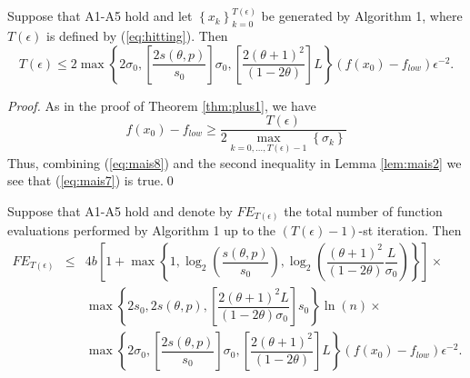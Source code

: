 \begin{theorem}
\label{thm:mais1}
Suppose that A1-A5 hold and let $\left\{x_{k}\right\}_{k=0}^{T(\epsilon)}$ be generated by Algorithm 1, where $T(\epsilon)$ is defined by (\ref{eq:hitting}). Then
\begin{equation}
T(\epsilon)\leq 2\max\left\{2\sigma_{0},\left[\dfrac{2 s(\theta,p)}{ s_{0}}\right]\sigma_{0},\left[\dfrac{2(\theta+1)^{2}}{(1-2\theta)}\right]L\right\}(f(x_{0})-f_{low})\epsilon^{-2}.
\label{eq:mais7}
\end{equation}
\end{theorem}

\begin{proof}
As in the proof of Theorem \ref{thm:plus1}, we have
\begin{equation}
f(x_{0})-f_{low}\geq\dfrac{T(\epsilon)}{2\max_{k=0,\ldots,T(\epsilon)-1}\left\{\sigma_{k}\right\}}
\label{eq:mais8}
\end{equation}
Thus, combining (\ref{eq:mais8}) and the second inequality in Lemma \ref{lem:mais2} we see that (\ref{eq:mais7}) is true.\qed
\end{proof}

\begin{corollary}
Suppose that A1-A5 hold and denote by $FE_{T(\epsilon)}$ the total number of function evaluations performed by Algorithm 1 up to the $(T(\epsilon)-1)$-st iteration. Then
\small
\begin{eqnarray}
FE_{T(\epsilon)}&\leq & 4b\left[1+\max\left\{1,\log_{2}\left(\dfrac{s(\theta,p)}{s_{0}}\right),\log_{2}\left(\dfrac{(\theta+1)^{2}}{(1-2\theta)}\dfrac{L}{\sigma_{0}}\right)\right\}\right]\times\nonumber\\
& & \max\left\{2s_{0},2s(\theta,p),\left[\dfrac{2(\theta+1)^{2}L}{(1-2\theta)\sigma_{0}}\right]s_{0}\right\}\ln(n)\times\nonumber\\
& & \max\left\{2\sigma_{0},\left[\dfrac{2 s(\theta,p)}{ s_{0}}\right]\sigma_{0},\left[\dfrac{2(\theta+1)^{2}}{(1-2\theta)}\right]L\right\}(f(x_{0})-f_{low})\epsilon^{-2}.
\label{eq:mais9}
\end{eqnarray}
\label{cor:mais1}
\end{corollary}
\normalsize

